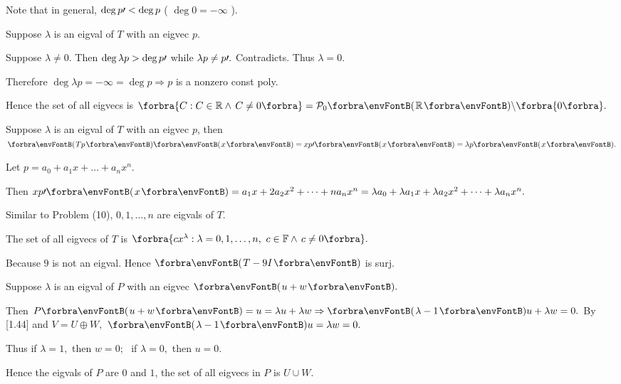 \documentclass[a4paper, 11pt, UTF8]{article}
\begin{document}
\begin{large}
\par\quad
Note that in general, $\deg p\prime<\deg p$ ( $\deg 0=-\infty$ ).\par\quad
Suppose $\lambda$ is an eigval of $T$ with an eigvec $p$.\par\quad
Suppose $\lambda\neq 0.$ Then $\deg\lambda p>\deg p\prime$ while $\lambda p\neq p\prime.$ Contradicts. Thus $\lambda=0.$\par\quad
Therefore $\deg \lambda p=-\infty=\deg p\Rightarrow p$ is a nonzero const poly.\par\quad
Hence the set of all eigvecs is $\Bra{C:C\in\Rbb\wedge\,C\neq 0}=\PoR{0}\backslash\zeroSubs.$\PfEnd
\SepLine

\par\quad
Suppose $\lambda$ is an eigval of $T$ with an eigvec $p$, then $\Par{Tp}\Par{x}=xp\apostrophe\Par{x}=\lambda p\Par{x}.$\par\quad
Let $p=a_0+a_1 x+\dots+a_n x^n.$\par\quad
Then $xp\apostrophe\Par{x}=a_1 x+2a_2 x^2+\dots+n a_n x^n=\lambda a_0+\lambda a_1 x+\lambda a_2 x^2+\dots+\lambda a_n x^n.$\par\quad
Similar to Problem (10), $0,1,\dots,n$ are eigvals of $T.$\par\quad
The set of all eigvecs of $T$ is $\Bra{cx^\lambda:\lambda=0,1,\dots,n,\,\,c\in\Fbb\wedge\,c\neq 0}.$\PfEnd
\SepLine

Because $9$ is not an eigval. Hence $\Par{T-9I}$ is surj.\PfEnd
\SepLine


\par\quad
Suppose $\lambda$ is an eigval of $P$ with an eigvec $\Par{u+w}.$\par\quad
Then $P\Par{u+w}=u=\lambda u+\lambda w\Rightarrow\Par{\lambda-1}u+\lambda w=0.$ By [1.44] and $V=U\oplus W,$ $\Par{\lambda-1}u=\lambda w=0.$\par\quad
Thus if $\lambda=1,$ then $w=0;$\,\, if $\lambda=0,$ then $u=0.$\par\quad
Hence the eigvals of $P$ are $0$ and $1$, the set of all eigvecs in $P$ is $U\cup W.$\PfEnd
\SepLine



\end{large}
\end{document}
